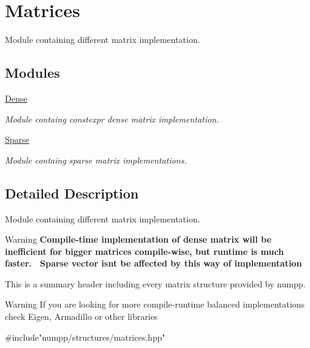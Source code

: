 \hypertarget{group__numpp__structures__matrices}{}\section{Matrices}
\label{group__numpp__structures__matrices}


Module containing different matrix implementation.  


\subsection*{Modules}
\begin{DoxyCompactItemize}
\item 
\hyperlink{group__numpp__structures__matrices__dense}{Dense}
\begin{DoxyCompactList}\small\item\em Module containg constexpr dense matrix implementation. \end{DoxyCompactList}\item 
\hyperlink{group__numpp__structures__matrices__sparse}{Sparse}
\begin{DoxyCompactList}\small\item\em Module containg sparse matrix implementations. \end{DoxyCompactList}\end{DoxyCompactItemize}


\subsection{Detailed Description}
Module containing different matrix implementation. 

\begin{DoxyWarning}{Warning}
{\bfseries Compile-\/time implementation of dense matrix will be inefficient for bigger matrices compile-\/wise, but runtime is much faster.~\newline
 Sparse vector isn\textquotesingle{}t be affected by this way of implementation}
\end{DoxyWarning}
This is a summary header including every matrix structure provided by numpp.

{\bfseries \begin{DoxyWarning}{Warning}
If you are looking for more compile-\/runtime balanced implementations check Eigen, Armadillo or other libraries
\end{DoxyWarning}

\begin{DoxyCode}
\textcolor{preprocessor}{#include"numpp/structures/matrices.hpp"}
\end{DoxyCode}
 }